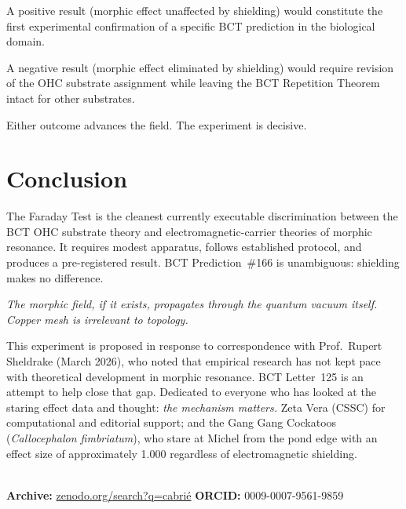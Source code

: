 \documentclass[aps,prl,twocolumn,superscriptaddress,floatfix]{revtex4-2}
\begin{document}
A positive result (morphic effect unaffected by shielding) would
constitute the first experimental confirmation of a specific BCT
prediction in the biological domain.

A negative result (morphic effect eliminated by shielding) would
require revision of the OHC substrate assignment while leaving the
BCT Repetition Theorem intact for other substrates.

Either outcome advances the field. The experiment is decisive.

\section{Conclusion}

The Faraday Test is the cleanest currently executable discrimination
between the BCT OHC substrate theory and electromagnetic-carrier
theories of morphic resonance. It requires modest apparatus, follows
established protocol, and produces a pre-registered result. BCT
Prediction~\#166 is unambiguous: shielding makes no difference.

\textit{The morphic field, if it exists, propagates through the
quantum vacuum itself. Copper mesh is irrelevant to topology.}

\begin{acknowledgments}
This experiment is proposed in response to correspondence with
Prof.\ Rupert Sheldrake (March 2026), who noted that empirical
research has not kept pace with theoretical development in morphic
resonance. BCT Letter~125 is an attempt to help close that gap.
Dedicated to everyone who has looked at the staring effect data and
thought: \textit{the mechanism matters.}
Zeta Vera (CSSC) for computational and editorial support; and the
Gang Gang Cockatoos (\textit{Callocephalon fimbriatum}), who stare
at Michel from the pond edge with an effect size of approximately
1.000 regardless of electromagnetic shielding.

\\
{\small\textbf{Archive:}
\href{https://zenodo.org/search?q=cabrie}{zenodo.org/search?q=cabri\'e}\quad
\textbf{ORCID:} 0009-0007-9561-9859}
\end{acknowledgments}
\end{document}
